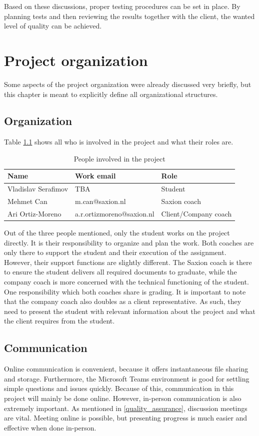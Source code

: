 \documentclass{report}
\begin{document}
	Based on these discussions, proper testing procedures can be set in place. By planning tests and then reviewing the results together with the client, the wanted level of quality can be achieved.
	
	\chapter{Project organization}
	Some aspects of the project organization were already discussed very briefly, but this chapter is meant to explicitly define all organizational structures.
	
	\section{Organization}
	Table \ref{involved} shows all who is involved in the project and what their roles are.
	
	\begin{table}[h]
		\centering
		\begin{tabular}{|l|l|l|}
			\hline
			Name                & Work email              & Role          \\ \hline
			Vladislav Serafimov & TBA   & Student       \\ \hline
			Mehmet Can   & m.can@saxion.nl & Saxion coach  \\ \hline
			Ari Ortiz-Moreno   & a.r.ortizmoreno@saxion.nl     & Client/Company coach \\ \hline
		\end{tabular}
		\caption{People involved in the project}
		\label{involved}
	\end{table}
	
	Out of the three people mentioned, only the student works on the project directly. It is their responsibility to organize and plan the work. Both coaches are only there to support the student and their execution of the assignment. However, their support functions are slightly different. The Saxion coach is there to ensure the student delivers all required documents to graduate, while the company coach is more concerned with the technical functioning of the student. One responsibility which both coaches share is grading. It is important to note that the company coach also doubles as a client representative. As such, they need to present the student with relevant information about the project and what the client requires from the student.
	
	\section{Communication} \label{communication}
	Online communication is convenient, because it offers instantaneous file sharing and storage. Furthermore, the Microsoft Teams environment is good for settling simple questions and issues quickly. Because of this, communication in this project will mainly be done online. However, in-person communication is also extremely important. As mentioned in \ref{quality_assurance}, discussion meetings are vital. Meeting online is possible, but presenting progress is much easier and effective when done in-person.
	
\end{document}
